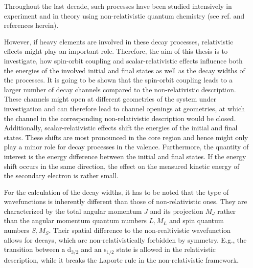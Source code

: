 Throughout the last decade, such processes have been studied intensively
in experiment 
and in theory using non-relativistic quantum chemistry
(see ref. \cite{Hergenhahn11} and references herein).

However, if heavy elements are involved in these decay processes, relativistic
effects might play an important role. Therefore, the aim of this
thesis is to investigate, how spin-orbit coupling and scalar-relativistic
effects influence both the energies of the involved initial and final states
as well as the decay widths of the processes.
It is going to be shown that the spin-orbit coupling leads to a larger number
of decay channels compared to the non-relativistic description. These channels
might open at different geometries of the system under investigation and
can therefore lead to channel openings at geometries, at which the channel
in the corresponding non-relativistic description would be closed. Additionally,
scalar-relativistic effects shift the energies of the initial and final states.
These shifts are most pronounced in the core region and hence might only play
a minor role for decay processes in the valence. Furthermore, the
quantity of interest is the energy difference between the initial and final
states. If the
energy shift occurs in the same direction, the effect on the measured kinetic
energy of the secondary electron is rather small.

For the calculation of the decay widths, it has to be noted that the type of
wavefunctions is inherently different than those of non-relativistic ones. They
are characterized by the total angular momentum $J$ and its projection $M_J$ rather
than the angular momentum quantum numbers $L,M_L$ and spin quantum numbers
$S,M_S$. Their spatial difference to the non-realtivistic wavefunction allows
for decays, which are non-relativistically forbidden by symmetry. E.g., the
transition between a d$_{3/2}$ and an s$_{1/2}$ state is allowed in the
relativistic description, while it breaks the Laporte rule in the non-relativistic
framework.


